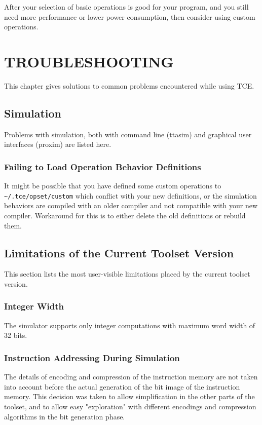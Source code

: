 \documentclass[twoside]{tceusermanual}
\begin{document}
After your selection of basic operations is good for your program, and you still 
need more performance or lower power consumption, then consider using custom 
operations. 

\chapter{TROUBLESHOOTING}
\label{chapter:troubleshooting}

This chapter gives solutions to common problems encountered while using TCE.

\section{Simulation}

Problems with simulation, both with command line (ttasim) and graphical
user interfaces (proxim) are listed here.

\subsection{Failing to Load Operation Behavior Definitions}

It might be possible that you have defined some custom operations to
\verb|~/.tce/opset/custom| which conflict with your new definitions, or the
simulation behaviors are compiled with an older compiler and not compatible
with your new compiler. Workaround for this is to either delete the old
definitions or rebuild them.

\section{Limitations of the Current Toolset Version}

This section lists the most user-visible limitations placed by the current
toolset version.

\subsection{Integer Width}

The simulator supports only integer computations with maximum word width of
32 bits. 

\subsection{Instruction Addressing During Simulation}

The details of encoding and compression of the instruction memory are not
taken into account before the actual generation of the bit image of the
instruction memory. This decision was taken to allow simplification in the
other parts of the toolset, and to allow easy "exploration" with different
encodings and compression algorithms in the bit generation phase.
\end{document}
